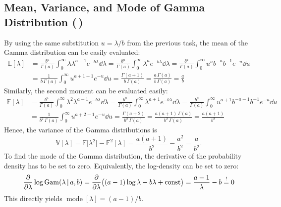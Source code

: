 \documentclass[11pt, a4paper]{scrartcl}
\newcommand{\E}{\mathbb{E}}
\newcommand{\Var}{\mathbb{V}}
\DeclareMathOperator{\mode}{mode}
\newcommand{\given}{\,\vert\,}
\newcommand{\diffstar}{\texorpdfstring{\raisebox{-1pt}{\resizebox{!}{8pt}{\(\star\)}}}{*}}
\newcommand{\twostar}  {(\diffstar\,\diffstar)}
\begin{document}
		\subsection{Mean, Variance, and Mode of Gamma Distribution  \twostar}
			By using the same substitution \( u = \lambda/b \) from the previous task, the mean of the Gamma distribution can be easily evaluated:
			\begin{align}
				\E[\lambda]
					&= \frac{b^a}{\Gamma(a)} \int_{0}^{\infty}\! \lambda \lambda^{a - 1} e^{-b\lambda} \dd{\lambda}
					 = \frac{b^a}{\Gamma(a)} \int_{0}^{\infty}\! \lambda^a e^{-b\lambda} \dd{\lambda}
					 = \frac{b^a}{\Gamma(a)} \int_{0}^{\infty}\! u^a b^{-a} b^{-1} e^{-u} \dd{u} \\
					&= \frac{1}{b \, \Gamma(a)} \int_{0}^{\infty}\! u^{a + 1 - 1} e^{-u} \dd{u}
					 = \frac{\Gamma(a + 1)}{b \, \Gamma(a)}
					 = \frac{a \, \Gamma(a)}{b \, \Gamma(a)}
					 = \frac{a}{b}
			\end{align}
			Similarly, the second moment can be evaluated easily:
			\begin{align}
				\E[\lambda]
					&= \frac{b^a}{\Gamma(a)} \int_{0}^{\infty}\! \lambda^2 \lambda^{a - 1} e^{-b\lambda} \dd{\lambda}
					 = \frac{b^a}{\Gamma(a)} \int_{0}^{\infty}\! \lambda^{a + 1} e^{-b\lambda} \dd{\lambda}
					 = \frac{b^a}{\Gamma(a)} \int_{0}^{\infty}\! u^{a + 1} b^{-a - 1} b^{-1} e^{-u} \dd{u} \\
					&= \frac{1}{b^2 \,\Gamma(a)} \int_{0}^{\infty}\! u^{a + 2 - 1} e^{-u} \dd{u}
					 = \frac{\Gamma(a + 2)}{b^2 \,\Gamma(a)}
					 = \frac{a (a + 1) \, \Gamma(a)}{b^2 \,\Gamma(a)}
					 = \frac{a (a + 1)}{b^2}
			\end{align}
			Hence, the variance of the Gamma distributions is
			\begin{equation}
				\Var[\lambda]
					= \E\big[\lambda^2\big] - \E^2[\lambda]
					= \frac{a (a + 1)}{b^2} - \frac{a^2}{b^2}
					= \frac{a}{b^2}.
			\end{equation}
			To find the mode of the Gamma distribution, the derivative of the probability density has to be set to zero. Equivalently, the log-density can be set to zero:
			\begin{align}
				\pdv{\lambda} \log \mathrm{Gam}(\lambda \given a, b)
					= \pdv{\lambda} \big( (a - 1) \log\lambda - b \lambda + \mathrm{const} \big)
					= \frac{a - 1}{\lambda} - b
					\overset{!}{=} 0
			\end{align}
			This directly yields \( \mode[\lambda] = (a - 1) / b \).
\end{document}
